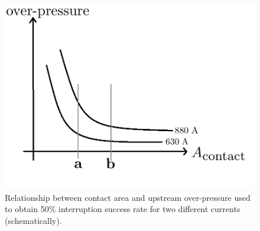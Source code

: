 \documentclass[10pt,b5paper,twoside]{article}
\begin{document}
\begin{figure}[H]
\centering
\includegraphics[scale=0.45]{Bilder/Results/pressureVSAcontact2.png}
\caption{Relationship between contact area and upstream over-pressure used to obtain 50\% interruption success rate for two different currents (schematically).} \label{fig:sketch50Intrate}
\end{figure}
\end{document}
